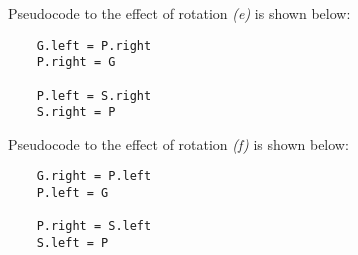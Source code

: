 Pseudocode to the effect of rotation \textit{(e)} is shown below:
\begin{verbatim}
    G.left = P.right
    P.right = G

    P.left = S.right
    S.right = P
\end{verbatim}

Pseudocode to the effect of rotation \textit{(f)} is shown below:
\begin{verbatim}
    G.right = P.left
    P.left = G

    P.right = S.left
    S.left = P
\end{verbatim}